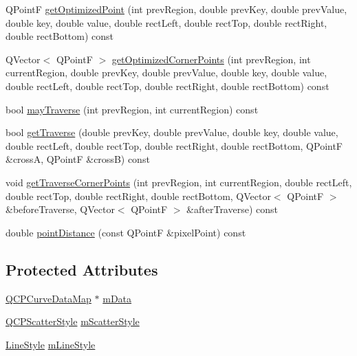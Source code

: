\begin{DoxyCompactItemize}
Q\+Point\+F \hyperlink{class_q_c_p_curve_acbcfea8986dde6c0143e3f7e8e76041d}{get\+Optimized\+Point} (int prev\+Region, double prev\+Key, double prev\+Value, double key, double value, double rect\+Left, double rect\+Top, double rect\+Right, double rect\+Bottom) const 
\item 
Q\+Vector$<$ Q\+Point\+F $>$ \hyperlink{class_q_c_p_curve_aad0b69d9a7a2a5367fcc9fe3edaf9bf4}{get\+Optimized\+Corner\+Points} (int prev\+Region, int current\+Region, double prev\+Key, double prev\+Value, double key, double value, double rect\+Left, double rect\+Top, double rect\+Right, double rect\+Bottom) const 
\item 
bool \hyperlink{class_q_c_p_curve_ae5b232c8201441a940516c745309a685}{may\+Traverse} (int prev\+Region, int current\+Region) const 
\item 
bool \hyperlink{class_q_c_p_curve_ab4ffdf3d62d5bd3a187f6668daf01f85}{get\+Traverse} (double prev\+Key, double prev\+Value, double key, double value, double rect\+Left, double rect\+Top, double rect\+Right, double rect\+Bottom, Q\+Point\+F \&cross\+A, Q\+Point\+F \&cross\+B) const 
\item 
void \hyperlink{class_q_c_p_curve_abe1721b19669e7127d76d144660fbeb8}{get\+Traverse\+Corner\+Points} (int prev\+Region, int current\+Region, double rect\+Left, double rect\+Top, double rect\+Right, double rect\+Bottom, Q\+Vector$<$ Q\+Point\+F $>$ \&before\+Traverse, Q\+Vector$<$ Q\+Point\+F $>$ \&after\+Traverse) const 
\item 
double \hyperlink{class_q_c_p_curve_acd7a68c6f268ce1ab845eaf69fc2c6a6}{point\+Distance} (const Q\+Point\+F \&pixel\+Point) const 
\end{DoxyCompactItemize}
\subsection*{Protected Attributes}
\begin{DoxyCompactItemize}
\item 
\hyperlink{qcustomplot_8h_a444d37ec9cb2951b3a7fe443c34d1658}{Q\+C\+P\+Curve\+Data\+Map} $\ast$ \hyperlink{class_q_c_p_curve_a88d533e455bca96004b049e99168731b}{m\+Data}
\item 
\hyperlink{class_q_c_p_scatter_style}{Q\+C\+P\+Scatter\+Style} \hyperlink{class_q_c_p_curve_a08f803b4a30b01bbd7a1eab15d0f864f}{m\+Scatter\+Style}
\item 
\hyperlink{class_q_c_p_curve_a2710e9f79302152cff794c6e16cc01f1}{Line\+Style} \hyperlink{class_q_c_p_curve_ae1f35ae2b15aee8e15bcdfec5be95156}{m\+Line\+Style}
\end{DoxyCompactItemize}
